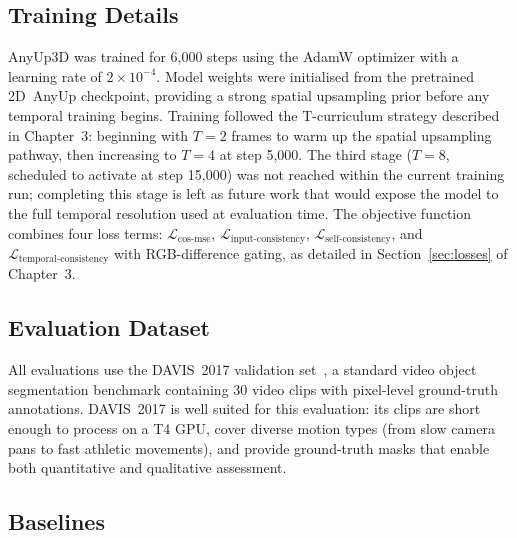 \subsection{Training Details}

AnyUp3D was trained for 6{,}000 steps using the AdamW optimizer with a learning rate of $2 \times 10^{-4}$.
Model weights were initialised from the pretrained 2D~AnyUp checkpoint, providing a strong spatial upsampling prior before any temporal training begins.
Training followed the T-curriculum strategy described in Chapter~3: beginning with $T\!=\!2$ frames to warm up the spatial upsampling pathway, then increasing to $T\!=\!4$ at step 5{,}000.
The third stage ($T\!=\!8$, scheduled to activate at step 15{,}000) was not reached within the current training run; completing this stage is left as future work that would expose the model to the full temporal resolution used at evaluation time.
The objective function combines four loss terms: $\mathcal{L}_\text{cos-mse}$, $\mathcal{L}_\text{input-consistency}$, $\mathcal{L}_\text{self-consistency}$, and $\mathcal{L}_\text{temporal-consistency}$ with RGB-difference gating, as detailed in Section~\ref{sec:losses} of Chapter~3.

\subsection{Evaluation Dataset}

All evaluations use the DAVIS~2017 validation set~\cite{davis2017}, a standard video object segmentation benchmark containing 30 video clips with pixel-level ground-truth annotations.
DAVIS~2017 is well suited for this evaluation: its clips are short enough to process on a T4 GPU, cover diverse motion types (from slow camera pans to fast athletic movements), and provide ground-truth masks that enable both quantitative and qualitative assessment.

\subsection{Baselines}

